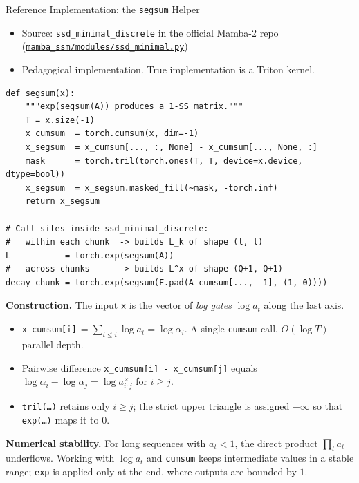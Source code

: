 \begin{frame}[fragile]{Reference Implementation: the \texttt{segsum} Helper}

    \begin{itemize}
        \item Source: \texttt{ssd\_minimal\_discrete} in the official Mamba-2 repo (\href{https://github.com/state-spaces/mamba/blob/main/mamba_ssm/modules/ssd_minimal.py}{\texttt{mamba\_ssm/modules/ssd\_minimal.py}})
        \item Pedagogical implementation. True implementation is a Triton kernel.
    \end{itemize}

  \vspace{0.5em}
\begin{lstlisting}
def segsum(x):
    """exp(segsum(A)) produces a 1-SS matrix."""
    T = x.size(-1)
    x_cumsum  = torch.cumsum(x, dim=-1)
    x_segsum  = x_cumsum[..., :, None] - x_cumsum[..., None, :]
    mask      = torch.tril(torch.ones(T, T, device=x.device, dtype=bool))
    x_segsum  = x_segsum.masked_fill(~mask, -torch.inf)
    return x_segsum

# Call sites inside ssd_minimal_discrete:
#   within each chunk  -> builds L_k of shape (l, l)
L           = torch.exp(segsum(A))
#   across chunks      -> builds L^x of shape (Q+1, Q+1)
decay_chunk = torch.exp(segsum(F.pad(A_cumsum[..., -1], (1, 0))))
\end{lstlisting}

  \vspace{0.3em}
  \textbf{Construction.} The input \texttt{x} is the vector of \emph{log gates} $\log a_t$ along the last axis.
  \begin{itemize}\itemsep1pt
    \item \texttt{x\_cumsum[i]}\,$= \sum_{t \le i} \log a_t = \log \alpha_i$. A single \texttt{cumsum} call, $O(\log T)$ parallel depth.
    \item Pairwise difference \texttt{x\_cumsum[i] - x\_cumsum[j]} equals $\log \alpha_i - \log \alpha_j = \log a^\times_{i:j}$ for $i \ge j$. 
    \item \texttt{tril(\dots)} retains only $i \ge j$; the strict upper triangle is assigned $-\infty$ so that \texttt{exp(\dots)} maps it to $0$.
  \end{itemize}

  \vspace{0.2em}
  \textbf{Numerical stability.} For long sequences with $a_t < 1$, the direct product $\prod_t a_t$ underflows. Working with $\log a_t$ and \texttt{cumsum} keeps intermediate values in a stable range; \texttt{exp} is applied only at the end, where outputs are bounded by $1$.
\end{frame}

